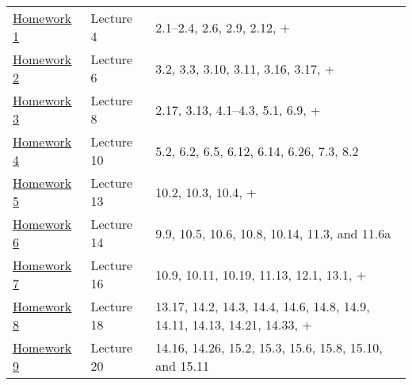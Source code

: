 \documentclass[10pt,letterpaper]{article}
\begin{document}
\begin{center}
\begin{tabular}{lll}
 \href{file:///Users/FingerMan/Desktop/Engineering/eng-control-and-cv/stanford hw/hw1sol.pdf}{Homework 1}  &  Lecture 4   &  2.1–2.4, 2.6, 2.9, 2.12, +                                                \\
 \href{file:///Users/FingerMan/Desktop/Engineering/eng-control-and-cv/stanford hw/hw2sol.pdf}{Homework 2}  &  Lecture 6   &  3.2, 3.3, 3.10, 3.11, 3.16, 3.17, +                                       \\
 \href{file:///Users/FingerMan/Desktop/Engineering/eng-control-and-cv/stanford hw/hw3sol.pdf}{Homework 3}  &  Lecture 8   &  2.17, 3.13, 4.1–4.3, 5.1, 6.9, +                                          \\
 \href{file:///Users/FingerMan/Desktop/Engineering/eng-control-and-cv/stanford hw/hw4sol.pdf}{Homework 4}  &  Lecture 10  &  5.2, 6.2, 6.5, 6.12, 6.14, 6.26, 7.3, 8.2                                 \\
 \href{file:///Users/FingerMan/Desktop/Engineering/eng-control-and-cv/stanford hw/hw5sol.pdf}{Homework 5}  &  Lecture 13  &  10.2, 10.3, 10.4, +                                                       \\
 \href{file:///Users/FingerMan/Desktop/Engineering/eng-control-and-cv/stanford hw/hw6sol.pdf}{Homework 6}  &  Lecture 14  &  9.9, 10.5, 10.6, 10.8, 10.14, 11.3, and 11.6a                             \\
 \href{file:///Users/FingerMan/Desktop/Engineering/eng-control-and-cv/stanford hw/hw7sol.pdf}{Homework 7}  &  Lecture 16  &  10.9, 10.11, 10.19, 11.13, 12.1, 13.1, +                                  \\
 \href{file:///Users/FingerMan/Desktop/Engineering/eng-control-and-cv/stanford hw/hw8sol.pdf}{Homework 8}  &  Lecture 18  &  13.17, 14.2, 14.3, 14.4, 14.6, 14.8, 14.9, 14.11, 14.13, 14.21, 14.33, +  \\
 \href{file:///Users/FingerMan/Desktop/Engineering/eng-control-and-cv/stanford hw/hw9sol.pdf}{Homework 9}  &  Lecture 20  &  14.16, 14.26, 15.2, 15.3, 15.6, 15.8, 15.10, and 15.11                    \\
\end{tabular}
\end{center}
\end{document}

